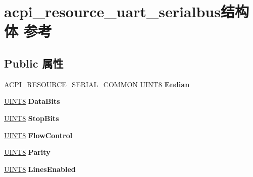 \hypertarget{structacpi__resource__uart__serialbus}{}\section{acpi\+\_\+resource\+\_\+uart\+\_\+serialbus结构体 参考}
\label{structacpi__resource__uart__serialbus}
\subsection*{Public 属性}
\begin{DoxyCompactItemize}
\item 
\mbox{\label{structacpi__resource__uart__serialbus_a7529dd493cbdcf386b8695b416457869}} 
A\+C\+P\+I\+\_\+\+R\+E\+S\+O\+U\+R\+C\+E\+\_\+\+S\+E\+R\+I\+A\+L\+\_\+\+C\+O\+M\+M\+ON \hyperlink{_processor_bind_8h_ab27e9918b538ce9d8ca692479b375b6a}{U\+I\+N\+T8} {\bfseries Endian}
\item 
\mbox{\label{structacpi__resource__uart__serialbus_aa2b3cf03838c416aae07e301b3dbf6d0}} 
\hyperlink{_processor_bind_8h_ab27e9918b538ce9d8ca692479b375b6a}{U\+I\+N\+T8} {\bfseries Data\+Bits}
\item 
\mbox{\label{structacpi__resource__uart__serialbus_a93364de2dd3da1d4f205f0f482be6e32}} 
\hyperlink{_processor_bind_8h_ab27e9918b538ce9d8ca692479b375b6a}{U\+I\+N\+T8} {\bfseries Stop\+Bits}
\item 
\mbox{\label{structacpi__resource__uart__serialbus_ad62f9c450bd45c62b7e11ee7b1995fb4}} 
\hyperlink{_processor_bind_8h_ab27e9918b538ce9d8ca692479b375b6a}{U\+I\+N\+T8} {\bfseries Flow\+Control}
\item 
\mbox{\label{structacpi__resource__uart__serialbus_a89a2d83f8ba424bda9f1175b2813a43d}} 
\hyperlink{_processor_bind_8h_ab27e9918b538ce9d8ca692479b375b6a}{U\+I\+N\+T8} {\bfseries Parity}
\item 
\mbox{\label{structacpi__resource__uart__serialbus_a912d352045fb04e0e0df77370c1992aa}} 
\hyperlink{_processor_bind_8h_ab27e9918b538ce9d8ca692479b375b6a}{U\+I\+N\+T8} {\bfseries Lines\+Enabled}

\end{DoxyCompactItemize}
